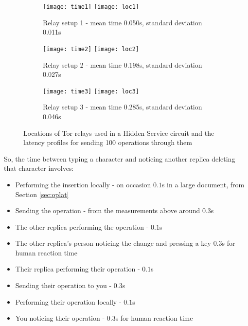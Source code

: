 \documentclass[diss.tex]{subfiles}
\begin{document}
\begin{figure}[H]
\hspace*{-3cm}\begin{minipage}{\paperwidth}
\begin{subfigure}{\linewidth}
\centering
\texttt{[image: time1]}
\texttt{[image: loc1]}
\caption{Relay setup 1 - mean time 0.050s, standard deviation 0.011s}
\label{fig:tor1}
\end{subfigure}

\begin{subfigure}{\linewidth}
\centering
\texttt{[image: time2]}
\texttt{[image: loc2]}
\caption{Relay setup 2 - mean time 0.198s, standard deviation 0.027s}
\label{fig:tor2}
\end{subfigure}

\begin{subfigure}{\linewidth}
\centering
\texttt{[image: time3]}
\texttt{[image: loc3]}
\caption{Relay setup 3 - mean time 0.285s, standard deviation 0.046s}
\label{fig:tor3}
\end{subfigure}
\end{minipage}
\caption{Locations of Tor relays used in a Hidden Service circuit and the latency profiles for sending 100 operations through them}
\label{fig:tortime}
\end{figure}


\noindent
So, the time between typing a character and noticing another replica deleting that character involves:
	\begin{itemize}
	\item Performing the insertion locally - on occasion $0.1$s in a large document, from Section \ref{sec:oplat}
	\item Sending the operation - from the measurements above around $0.3$s
	\item The other replica performing the operation - $0.1$s
	\item The other replica's person noticing the change and pressing a key $0.3$s for human reaction time
	\item Their replica performing their operation - $0.1$s
	\item Sending their operation to you - $0.3$s
	\item Performing their operation locally - $0.1$s
	\item You noticing their operation - $0.3$s for human reaction time
	\end{itemize}
	
\end{document}
